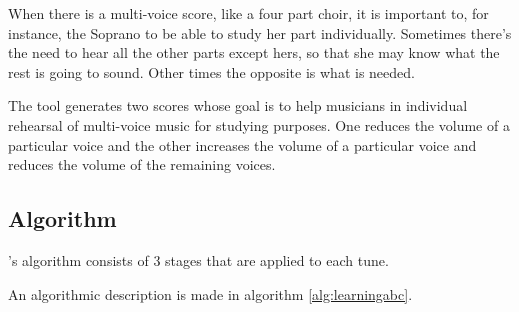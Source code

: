 When there is a multi-voice score, like a four part choir, it is important to, for instance, the
Soprano to be able to study her part individually. Sometimes there's the need to hear all the other
parts except hers, so that she may know what the rest is going to sound. Other times the opposite is
what is needed.

The \learningabc{} tool generates two \abc{} scores whose goal is to help musicians in individual
rehearsal of multi-voice music for studying purposes. One reduces the volume of a particular voice
and the other increases the volume of a particular voice and reduces the volume of the remaining
voices.

\subsection*{Algorithm}

\learningabc{}'s algorithm consists of 3 stages that are applied to each tune.

An algorithmic description is made in algorithm \ref{alg:learningabc}.\\

